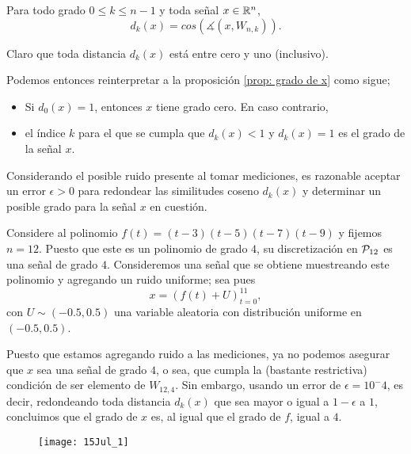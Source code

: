 \begin{notacion}
Para todo grado $0 \leq k \leq n-1$ y toda señal $x \in \mathbb{R}^{n}$,
\begin{equation}
	\label{eq: distancia de x a Wnk}
	d_{k}(x) = cos(\measuredangle(x, W_{n,k})).
\end{equation}
\end{notacion}
Claro que toda distancia $d_{k}(x)$ está entre cero y uno
(inclusivo).

Podemos entonces reinterpretar a la proposición
\ref{prop: grado de x} como sigue;
\begin{itemize}
	\item Si $d_{0}(x) = 1$, entonces $x$ tiene grado cero. En caso 
	contrario,
	\item el índice $k$ para el que se cumpla que $d_{k}(x) < 1$
	y $d_{k}(x) = 1$ es el grado de la señal $x$.
\end{itemize} 

Considerando el posible ruido presente al tomar
mediciones, es razonable aceptar un error $\epsilon > 0$
para redondear las similitudes coseno $d_{k}(x)$ y
determinar un posible grado para la señal $x$ en cuestión.


\begin{ejemplo}
Considere al polinomio $f(t) = (t-3)(t-5)(t-7)(t-9)$
y fijemos $n = 12$. Puesto que este es un polinomio de grado 
$4$, su discretización en $\mathcal{P}_{12}$ es una señal de
grado $4$. Consideremos una señal que se obtiene muestreando
este polinomio y agregando un ruido uniforme; sea pues
\begin{equation}
	\label{eq: x con ruido}
	x = (f(t) + U )_{t=0}^{11},
\end{equation}
con $U \sim (-0.5, 0.5)$ una variable aleatoria con distribución
uniforme en $(-0.5, 0.5)$.

Puesto que estamos agregando ruido a las mediciones,
ya no podemos asegurar que $x$ sea una 
señal de grado $4$, o sea, que cumpla la (bastante restrictiva)
condición de ser elemento de $W_{12,4}$. Sin embargo,
usando un error de $\epsilon = 10^-4$, es decir, 
redondeando toda distancia $d_{k}(x)$ que sea mayor o igual
a $1 - \epsilon$ a $1$, concluimos que el grado de $x$ es,
al igual que el grado de $f$, igual a $4$. 

\begin{figure}[H]
	\centering
	\texttt{[image: 15Jul\_1]} 
\end{figure}	
\final
\end{ejemplo}


